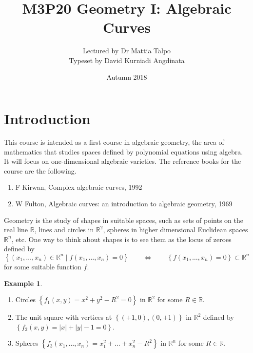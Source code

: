 \documentclass{article}
\title{M3P20 Geometry I: Algebraic Curves}
\author{Lectured by Dr Mattia Talpo \\ Typeset by David Kurniadi Angdinata}
\date{Autumn 2018}
\newcommand{\R}{\mathbb{R}}
\newcommand{\rb}[1]{\left( #1 \right)}
\newcommand{\cb}[1]{\left\{ #1 \right\}}
\newcommand{\abs}[1]{\left\lvert #1 \right\rvert}
\theoremstyle{definition}\newtheorem{definition}{Definition}[section]
\theoremstyle{definition}\newtheorem{notation}[definition]{Notation}
\theoremstyle{definition}\newtheorem{remark}[definition]{Remark}
\theoremstyle{definition}\newtheorem{example}[definition]{Example}
\theoremstyle{definition}\newtheorem{fact}{Fact}
\theoremstyle{definition}\newtheorem{exercise}{Exercise}
\begin{document}
\maketitle

\vfill

\tableofcontents

\pagebreak


\section{Introduction}

This course is intended as a first course in algebraic geometry, the area of mathematics that studies spaces defined by polynomial equations using algebra. It will focus on one-dimensional algebraic varieties. The reference books for the course are the following.
\begin{enumerate}
\item F Kirwan, Complex algebraic curves, 1992
\item W Fulton, Algebraic curves: an introduction to algebraic geometry, 1969
\end{enumerate}

Geometry is the study of shapes in suitable spaces, such as sets of points on the real line $ \R $, lines and circles in $ \R^2 $, spheres in higher dimensional Euclidean spaces $ \R^n $, etc. One way to think about shapes is to see them as the locus of zeroes defined by
$$ \cb{\rb{x_1, \dots, x_n} \in \R^n \mid f\rb{x_1, \dots, x_n} = 0} \qquad \iff \qquad \cb{f\rb{x_1, \dots, x_n} = 0} \subset \R^n $$
for some suitable function $ f $.

\begin{example}
\hfill
\begin{enumerate}
\item Circles $ \cb{f_1\rb{x, y} = x^2 + y^2 - R^2 = 0} $ in $ \R^2 $ for some $ R \in \R $.
\item The unit square with vertices at $ \cb{\rb{\pm 1, 0}, \rb{0, \pm 1}} $ in $ \R^2 $ defined by $ \cb{f_2\rb{x, y} = \abs{x} + \abs{y} - 1 = 0} $.
\item Spheres $ \cb{f_3\rb{x_1, \dots, x_n} = x_1^2 + \dots + x_n^2 - R^2} $ in $ \R^n $ for some $ R \in \R $.
\end{enumerate}
\end{example}
\end{document}
